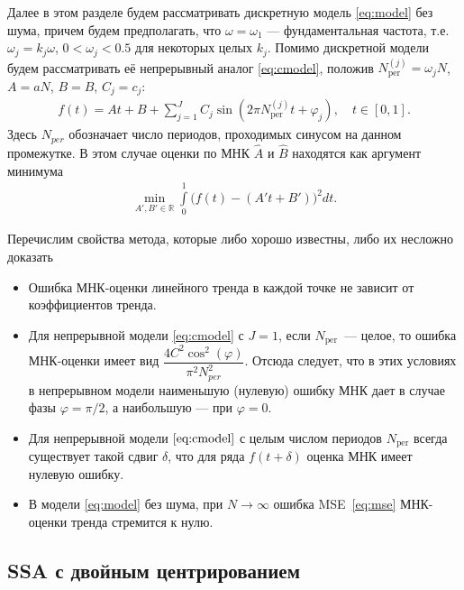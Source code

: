 \documentclass{spisok-article}
\begin{document}
Далее в этом разделе будем рассматривать дискретную модель \eqref{eq:model} без шума,
причем будем предполагать, что $\omega=\omega_1$ --- фундаментальная частота, т.е.
$\omega_j= k_j \omega$, $0<\omega_j<0.5$ для некоторых целых $k_j$.
Помимо дискретной модели
будем рассматривать её непрерывный аналог \eqref{eq:cmodel}, положив $N_\mathrm{per}^{(j)}=\omega_j N$,
$A = aN$, $B=B$, $C_j=c_j$:
\begin{align}
\label{eq:cmodel}
f(t)=At+B+\sum_{j=1}^J C_j\sin\left(2\pi N_\mathrm{per}^{(j)} t +\varphi_j\right), \quad t\in[0,1].
\end{align}
Здесь $N_{per}$ обозначает число периодов, проходимых синусом на данном промежутке. В этом случае оценки по МНК  $\hat{A}$ и $\hat{B}$ находятся как 
аргумент минимума
\begin{align*}
\min_{A',B'\in \mathbb{R}}\int\limits_0^1\big( f(t) -({A'}t+{B'})\big)^2dt.
\end{align*}

Перечислим свойства метода, которые либо хорошо известны, либо их
несложно доказать
\begin{itemize}
\item
Ошибка МНК-оценки линейного тренда в каждой точке не зависит от коэффициентов тренда.
\item
Для непрерывной модели \eqref{eq:cmodel} с $J=1$, если $N_\mathrm{per}$~--- целое,
то ошибка МНК-оценки имеет вид $\dfrac{4C^2\cos^2(\varphi)}{\pi^2 N_{per}^2}$. Отсюда следует, что 
в этих условиях в непрерывном модели
наименьшую (нулевую) ошибку МНК дает в случае
фазы $\varphi=\pi/2$, а наибольшую --- при $\varphi=0$.
\item
Для непрерывной модели $\eqref{eq:cmodel}$ с целым числом периодов $N_\mathrm{per}$
всегда существует такой сдвиг $\delta$, что для ряда $f(t+\delta)$
оценка МНК имеет нулевую ошибку.
\item
В модели \eqref{eq:model} без шума, при $N\rightarrow\infty$ ошибка MSE~\eqref{eq:mse} МНК-оценки тренда стремится к нулю.
\end{itemize}

\subsection{SSA с двойным центрированием}
\end{document}
